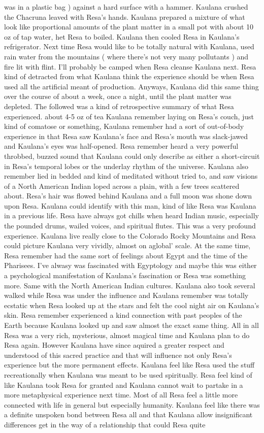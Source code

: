 \documentclass[12pt]{book}
\begin{document}
was in a plastic bag ) against a hard surface with a hammer. Kaulana crushed the Chacruna leaved with Resa's hands. Kaulana prepared a mixture of what look like proportional amounts of the plant matter in a small pot with about 10 oz of tap water, het Resa to boiled. Kaulana then cooled Resa in Kaulana's refrigerator. Next time Resa would like to be totally natural with Kaulana, used rain water from the mountains ( where there's not very many pollutants ) and fire lit with flint. I'll probably be camped when Resa cleanse Kaulana next. Resa kind of detracted from what Kaulana think the experience should be when Resa used all the artificial meant of production. Anyways, Kaulana did this same thing over the course of about a week, once a night, until the plant matter was depleted. The followed was a kind of retrospective summary of what Resa experienced. about 4-5 oz of tea Kaulana remember laying on Resa's couch, just kind of comatose or something, Kaulana remember had a sort of out-of-body experience in that Resa saw Kaulana's face and Resa's mouth was slack-jawed and Kaulana's eyes was half-opened. Resa remember heard a very powerful throbbed, buzzed sound that Kaulana could only describe as either a short-circuit in Resa's temporal lobes or the underlay rhythm of the universe. Kaulana also remember lied in bedded and kind of meditated without tried to, and saw visions of a North American Indian loped across a plain, with a few trees scattered about. Resa's hair was flowed behind Kaulana and a full moon was shone down upon Resa. Kaulana could identify with this man, kind of like Resa was Kaulana in a previous life. Resa have always got chills when heard Indian music, especially the pounded drums, wailed voices, and spiritual flutes. This was a very profound experience. Kaulana live really close to the Colorado Rocky Mountains and Resa could picture Kaulana very vividly, almost on aglobal' scale. At the same time, Resa remember had the same sort of feelings about Egypt and the time of the Pharisees. I've alwasy was fascinated with Egyptology and maybe this was either a psychological manifestation of Kaulana's fascination or Resa was something more. Same with the North American Indian cultures. Kaulana also took several walked while Resa was under the influence and Kaulana remember was totally ecstatic when Resa looked up at the stars and felt the cool night air on Kaulana's skin. Resa remember experienced a kind connection with past peoples of the Earth because Kaulana looked up and saw almost the exact same thing. All in all Resa was a very rich, mysterious, almost magical time and Kaulana plan to do Resa again. However Kaulana have since aquired a greater respect and understood of this sacred practice and that will influence not only Resa's experience but the more permanent effects. Kaulana feel like Resa used the stuff recreationally when Kaulana was meant to be used spiritually. Resa feel kind of like Kaulana took Resa for granted and Kaulana cannot wait to partake in a more metaphysical experience next time. Most of all Resa feel a little more connected with life in general but especially humanity. Kaulana feel like there was a definite unspoken bond between Resa all and that Kaulana allow insignificant differences get in the way of a relationship that could Resa quite 
\end{document}
